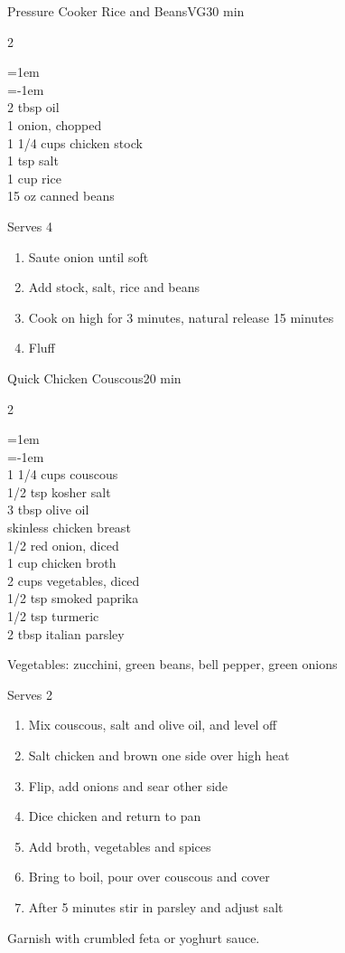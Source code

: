 \documentclass{article}
\newenvironment{recipe}[3][]
    {\begin{cardbase}[#1]{#2}{#3}
    \columnratio{0.333}
    \begin{paracol}{2}}
    {\end{paracol}\end{cardbase}}
\newenvironment{denserecipe}[3][]
    {\small
    \begin{recipe}[#1]{#2}{#3}}
    {\end{recipe}}
\newcommand{\nextcolumn}{\switchcolumn}
\newenvironment{ingredients}
    {
    \begin{obeylines}
    \vspace{\parskip}
    \setlength{\parskip}{0.25em}
    \vspace{-0.25em}
    \leftskip=1em
    \parindent=-1em}
    {\end{obeylines}}
\newenvironment{steps}
    {\begin{enumerate}[leftmargin=*,topsep=0pt]}
    {\end{enumerate}}
\newcommand{\tag}[1]{\hspace{1em}#1}
\newcommand{\symboltag}[2]{\tag{#1\hspace{0.4em}#2}}
\newcommand{\totaltime}[1]{\symboltag{\raisebox{-0.1em}{\small\StopWatchEnd}}{#1}}
\begin{document}
\begin{recipe}{Pressure Cooker Rice and Beans}{\tag{VG}\totaltime{30 min}}
\begin{ingredients}
2 tbsp oil
1 onion, chopped
1 1/4 cups chicken stock
1 tsp salt
1 cup rice
15 oz canned beans
\end{ingredients}
\nextcolumn
Serves 4
\begin{steps}
    \item Saute onion until soft
    \item Add stock, salt, rice and beans
    \item Cook on high for 3 minutes, natural release 15 minutes
    \item Fluff
\end{steps}
\end{recipe}

\begin{denserecipe}{Quick Chicken Couscous}{\totaltime{20 min}}
\begin{ingredients}
1 1/4 cups couscous
1/2 tsp kosher salt
3 tbsp olive oil
skinless chicken breast
1/2 red onion, diced
1 cup chicken broth
2 cups vegetables, diced
1/2 tsp smoked paprika
1/2 tsp turmeric
2 tbsp italian parsley
\end{ingredients}
\nextcolumn
Vegetables: zucchini, green beans, bell pepper, green onions

Serves 2
\begin{steps}
    \item Mix couscous, salt and olive oil, and level off
    \item Salt chicken and brown one side over high heat
    \item Flip, add onions and sear other side
    \item Dice chicken and return to pan
    \item Add broth, vegetables and spices
    \item Bring to boil, pour over couscous and cover
    \item After 5 minutes stir in parsley and adjust salt
\end{steps}
Garnish with crumbled feta or yoghurt sauce.
\end{denserecipe}
\end{document}

